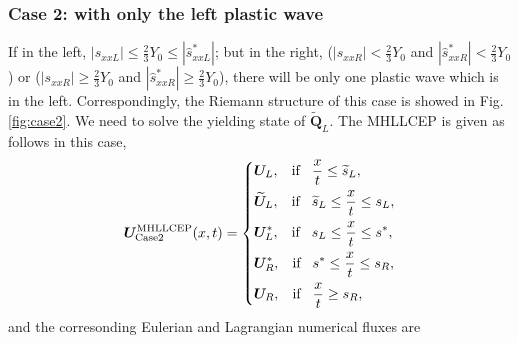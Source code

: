 \documentclass{article}
\numberwithin{equation}{section}
\numberwithin{table}{section}
\begin{document}
 \subsubsection{Case 2:  with only  the left plastic wave}\label{sec:case2}
 If in the left, $|s_{xxL}| \le \frac{2}{3}Y_0 \le  |\hat{s}_{xxL}^*|$; but in the right, ($|s_{xxR}|<\frac{2}{3}Y_0$ and $|\hat{s}_{xxR}^*| < \frac{2}{3}Y_0$) or ($|s_{xxR}|\geq \frac{2}{3}Y_0$ and $|\hat{s}_{xxR}^*| \geq \frac{2}{3}Y_0$), there will be only one plastic wave which is in the left. Correspondingly, the Riemann structure of this case is showed in Fig.\ref{fig:case2}. We need to solve the yielding state of $\widetilde{\bm{Q}}_L$. The MHLLCEP is given as follows in this case,
 \begin{equation}\label{eq:HLLCEP2}
   \bm{U}^{\text{MHLLCEP}}_{\text{Case2}}(x,t) = \left\{ \begin{aligned}
	   & \bm{U}_L, \hspace{0.3cm} \text{if} \hspace{0.3cm} \frac{x}{t}\le \widetilde{s}_L, \\
		&  \widetilde{\bm{U}}_L, \hspace{0.3cm} \text{if} \hspace{0.3cm} \widetilde{s}_L\le \frac{x}{t} \le  s_L, \\
		&\bm{U}_L^*, \hspace{0.3cm} \text{if} \hspace{0.3cm} s_L\le \frac{x}{t} \le s^*, \\
		& \bm{U}_R^*, \hspace{0.3cm} \text{if} \hspace{0.3cm} s^*\le \frac{x}{t} \le s_R,\\
		& \bm{U}_R, \hspace{0.3cm} \text{if} \hspace{0.3cm} \frac{x}{t}\ge s_R, \\
	  \end{aligned}
	\right.
  \end{equation}
  and the corresonding Eulerian and Lagrangian numerical fluxes are
\end{document}

